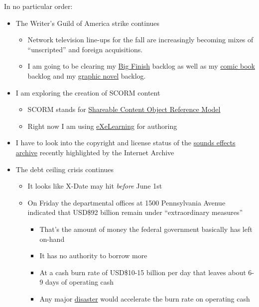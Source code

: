 In no particular order:

\begin{itemize}
\tightlist
\item
  The Writer's Guild of America strike continues

  \begin{itemize}
  \tightlist
  \item
    Network television line-ups for the fall are increasingly becoming
    mixes of ``unscripted'' and foreign acquisitions.
  \item
    I am going to be clearing my \href{https://www.bigfinish.com}{Big
    Finish} backlog as well as my
    \href{https://simple.wikipedia.org/w/index.php?title=Comic_book&oldid=8831423}{comic
    book} backlog and my
    \href{https://simple.wikipedia.org/w/index.php?title=Graphic_novel&oldid=8749592}{graphic
    novel} backlog.
  \end{itemize}
\item
  I am exploring the creation of SCORM content

  \begin{itemize}
  \tightlist
  \item
    SCORM stands for
    \href{https://en.wikipedia.org/w/index.php?title=Sharable_Content_Object_Reference_Model&oldid=1135535399}{Shareable
    Content Object Reference Model}
  \item
    Right now I am using
    \href{https://github.com/exelearning/iteexe}{eXeLearning} for
    authoring
  \end{itemize}
\item
  I have to look into the copyright and license status of the
  \href{https://blog.archive.org/2023/05/20/crash-bark-boom-the-usc-sound-effects-library/}{sounds
  effects archive} recently highlighted by the Internet Archive
\item
  The debt ceiling crisis continues

  \begin{itemize}
  \tightlist
  \item
    It looks like X-Date may hit \emph{before} June 1st
  \item
    On Friday the departmental offices at 1500 Pennsylvania Avenue
    indicated that USD\$92 billion remain under ``extraordinary
    measures''

    \begin{itemize}
    \tightlist
    \item
      That's the amount of money the federal government basically has
      left on-hand
    \item
      It has no authority to borrow more
    \item
      At a cash burn rate of USD\$10-15 billion per day that leaves
      about 6-9 days of operating cash
    \item
      Any major
      \href{https://simple.wikipedia.org/w/index.php?title=Disaster&oldid=8642347}{disaster}
      would accelerate the burn rate on operating cash


\end{itemize}
\end{itemize}
\end{itemize}
